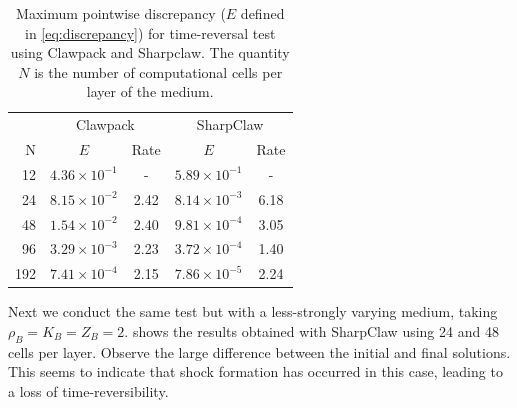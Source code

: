 \begin{table} \centering
\begin{tabular}{r|cc|cc} \hline
& \multicolumn{2}{c}{Clawpack} & \multicolumn{2}{c}{SharpClaw} \\
N & $E$ & Rate & $E$ & Rate \\ \hline
12 & $4.36 \times 10^{-1}$ & -    &  $5.89 \times 10^{-1}$ & -    \\
24 & $8.15 \times 10^{-2}$ & 2.42 &  $8.14 \times 10^{-3}$ & 6.18 \\
48 & $1.54 \times 10^{-2}$ & 2.40 &  $9.81 \times 10^{-4}$ & 3.05 \\
96 & $3.29 \times 10^{-3}$ & 2.23 &  $3.72 \times 10^{-4}$ & 1.40 \\ 
192& $7.41 \times 10^{-4}$ & 2.15 &  $7.86 \times 10^{-5}$ & 2.24 \\ 
\hline
\end{tabular}
\caption{Maximum pointwise discrepancy ($E$ defined in \ref{eq:discrepancy}) for 
time-reversal test using Clawpack and Sharpclaw.
The quantity $N$ is the number of computational cells per layer of the
medium.\label{tbl:trconv}}
\end{table}


Next we conduct the same test but with a less-strongly varying medium,
taking $\rho_B=K_B=Z_B=2$.
 shows the results obtained with SharpClaw using 24 and
48 cells per layer.  Observe the large 
difference between the initial and final solutions.
This seems to indicate that shock formation has occurred in 
this case, leading to a loss of time-reversibility.

